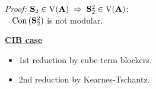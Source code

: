 \documentclass[xcolor=dvipsnames,9pt,hide notes,mathserif]{beamer}
\begin{document}
{\begin{columns}
\begin{column}{0.6\textwidth}
\begin{overprint}
\begin{itemize}
          \emph{Proof:} $\mathbf{S}_2 \in \operatorname{V}(\mathbf{A}) \; \Rightarrow\; \mathbf{S}_2^2 \in \operatorname{V}(\mathbf{A})$;\\[4pt]
          ~  $\mathrm{Con}\,(\mathbf{S}_2^2)$ is not modular.
        \end{itemize}
        \underline{{\bf CIB case}}
        \begin{itemize}
        \item<3-> 1st reduction by cube-term blockers.
        \end{itemize}
        \begin{itemize}
        \item<5->2nd reduction by Kearnes-Tschantz.
        \end{itemize}
      \end{overprint}
    \end{column}
  \end{columns}
}



\end{document}
